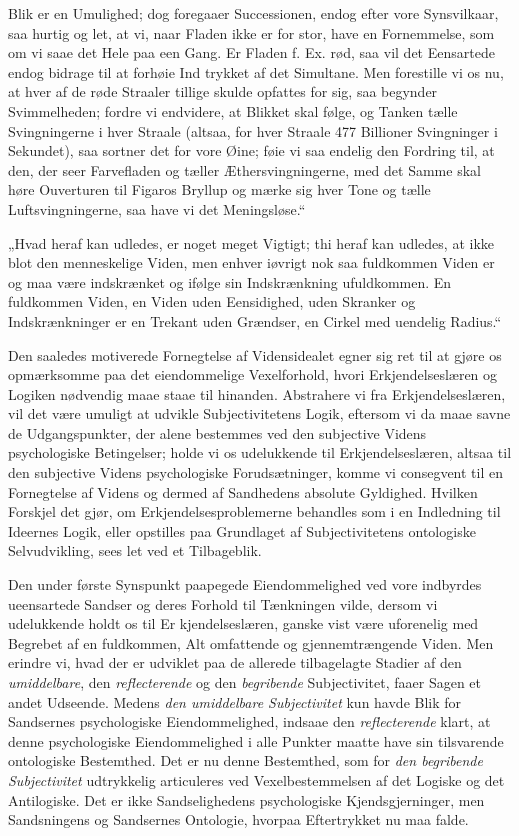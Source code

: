 \documentclass[11pt]{book}
\newcommand{\opage}[1]{\marginnote{\footnotesize\textit{[#1]}}}
\begin{document}
Blik er en Umulighed; dog foregaaer Successionen, endog efter vore
Synsvilkaar, saa hurtig og let, at vi, naar Fladen ikke er for stor,
have en Fornemmelse, som om vi saae det Hele paa een Gang. Er Fladen
f. Ex. rød, saa vil det Eensartede endog bidrage til at forhøie Ind\-%
\opage{249} \setcounter{footnote}{0}%
trykket af det Simultane. Men forestille vi os nu, at hver af de røde
Straaler tillige skulde opfattes for sig, saa begynder Svimmelheden;
fordre vi endvidere, at Blikket skal følge, og Tanken tælle
Svingningerne i hver Straale (altsaa, for hver Straale 477 Billioner
Svingninger i Sekundet), saa sortner det for vore Øine; føie vi saa
endelig den Fordring til, at den, der seer Farvefladen og tæller
Æthersvingningerne, med det Samme skal høre Ouverturen til Figaros
Bryllup og mærke sig hver Tone og tælle Luftsvingningerne, saa have vi
det Meningsløse.“

„Hvad heraf kan udledes, er noget meget Vigtigt; thi heraf kan udledes,
at ikke blot den menneskelige Viden, men enhver iøvrigt nok saa
fuldkommen Viden er og maa være indskrænket og ifølge sin Indskrænkning
ufuldkommen. En fuldkommen Viden, en Viden uden Eensidighed, uden
Skranker og Indskrænkninger er en Trekant uden Grændser, en Cirkel med
uendelig Radius.“

Den saaledes motiverede Fornegtelse af Vidensidealet egner sig ret til
at gjøre os opmærksomme paa det eiendommelige Vexelforhold, hvori
Erkjendelseslæren og Logiken nødvendig maae staae til hinanden.
Abstrahere vi fra Erkjendelseslæren, vil det være umuligt at udvikle
Subjectivitetens Logik, eftersom vi da maae savne de Udgangspunkter,
der alene bestemmes ved den subjective Videns psychologiske
Betingelser; holde vi os udelukkende til Erkjendelseslæren, altsaa til
den subjective Videns psychologiske Forudsætninger, komme vi consegvent
til en Fornegtelse af Videns og dermed af Sandhedens absolute
Gyldighed. Hvilken Forskjel det gjør, om Erkjendelsesproblemerne
behandles som i en Indledning til Ideernes Logik, eller opstilles paa
Grundlaget af Subjectivitetens ontologiske Selvudvikling, sees let ved
et Tilbageblik.

Den under første Synspunkt paapegede Eiendommelighed ved vore indbyrdes
ueensartede Sandser og deres Forhold til Tænkningen vilde, dersom vi
udelukkende holdt os til Er\-%
\opage{250} \setcounter{footnote}{0}%
kjendelseslæren, ganske vist være uforenelig med Begrebet af en
fuldkommen, Alt omfattende og gjennemtrængende Viden. Men erindre vi,
hvad der er udviklet paa de allerede tilbagelagte Stadier af den
\emph{umiddelbare}, den \emph{reflecterende} og den \emph{begribende}
Subjectivitet, faaer Sagen et andet Udseende. Medens \emph{den
umiddelbare Subjectivitet} kun havde Blik for Sandsernes psychologiske
Eiendommelighed, indsaae den \emph{reflecterende} klart, at denne
psychologiske Eiendommelighed i alle Punkter maatte have sin
tilsvarende ontologiske Bestemthed. Det er nu denne Bestemthed, som for
\emph{den begribende Subjectivitet} udtrykkelig articuleres ved
Vexelbestemmelsen af det Logiske og det Antilogiske. Det er ikke
Sandselighedens psychologiske Kjendsgjerninger, men Sandsningens og
Sandsernes Ontologie, hvorpaa Eftertrykket nu maa falde.
\end{document}
